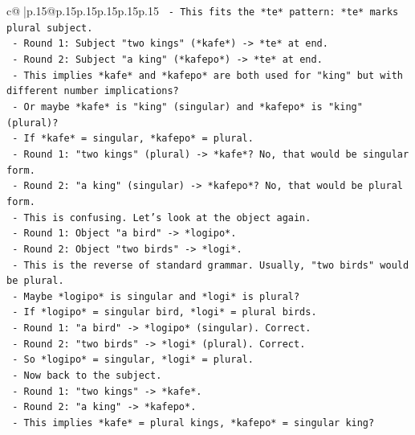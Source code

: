 \documentclass{article}
\begin{document}
{\begin{supertabular}{c@{$\;$}|p{.15\linewidth}@{}p{.15\linewidth}p{.15\linewidth}p{.15\linewidth}p{.15\linewidth}p{.15\linewidth}}
{{{\texttt{              {-} This fits the *te* pattern: *te* marks plural subject.} \\
\texttt{                {-} Round 1: Subject "two kings" (*kafe*) {-}> *te* at end.} \\
\texttt{                {-} Round 2: Subject "a king" (*kafepo*) {-}> *te* at end.} \\
\texttt{              {-} This implies *kafe* and *kafepo* are both used for "king" but with different number implications?} \\
\texttt{              {-} Or maybe *kafe* is "king" (singular) and *kafepo* is "king" (plural)?} \\
\texttt{                {-} If *kafe* = singular, *kafepo* = plural.} \\
\texttt{                {-} Round 1: "two kings" (plural) {-}> *kafe*? No, that would be singular form.} \\
\texttt{                {-} Round 2: "a king" (singular) {-}> *kafepo*? No, that would be plural form.} \\
\texttt{              {-} This is confusing. Let's look at the object again.} \\
\texttt{              {-} Round 1: Object "a bird" {-}> *logipo*.} \\
\texttt{              {-} Round 2: Object "two birds" {-}> *logi*.} \\
\texttt{              {-} This is the reverse of standard grammar. Usually, "two birds" would be plural.} \\
\texttt{              {-} Maybe *logipo* is singular and *logi* is plural?} \\
\texttt{                {-} If *logipo* = singular bird, *logi* = plural birds.} \\
\texttt{                {-} Round 1: "a bird" {-}> *logipo* (singular). Correct.} \\
\texttt{                {-} Round 2: "two birds" {-}> *logi* (plural). Correct.} \\
\texttt{              {-} So *logipo* = singular, *logi* = plural.} \\
\texttt{              {-} Now back to the subject.} \\
\texttt{              {-} Round 1: "two kings" {-}> *kafe*.} \\
\texttt{              {-} Round 2: "a king" {-}> *kafepo*.} \\
\texttt{              {-} This implies *kafe* = plural kings, *kafepo* = singular king?} \\
}}}
\end{supertabular}}
\end{document}
